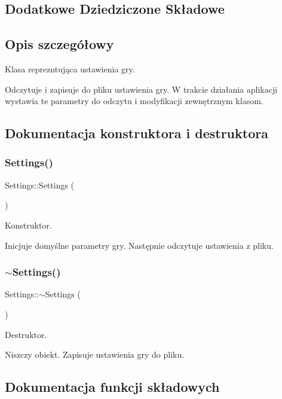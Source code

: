 \subsection*{Dodatkowe Dziedziczone Składowe}


\subsection{Opis szczegółowy}
Klasa reprezntująca ustawienia gry. 

Odczytuje i zapisuje do pliku ustawienia gry. W trakcie działania aplikacji wystawia te parametry do odczytu i modyfikacji zewnętrznym klasom. 

\subsection{Dokumentacja konstruktora i destruktora}
\mbox{\label{class_settings_ab7169a6eefce79566dd07db3b1e5e967}} 
\subsubsection{Settings()}
{\footnotesize\ttfamily Settings\+::\+Settings (\begin{DoxyParamCaption}{ }\end{DoxyParamCaption})}



Konstruktor. 

Inicjuje domyślne parametry gry. Następnie odczytuje ustawienia z pliku. \mbox{\label{class_settings_a4a65be5921dfc9fddc476e5320541d89}} 
\subsubsection{$\sim$Settings()}
{\footnotesize\ttfamily Settings\+::$\sim$\+Settings (\begin{DoxyParamCaption}{ }\end{DoxyParamCaption})}



Destruktor. 

Niszczy obiekt. Zapisuje ustawienia gry do pliku. 

\subsection{Dokumentacja funkcji składowych}
\mbox{\label{class_settings_ae0ced8b7ae1970897abde3e35cc2237d}} 
